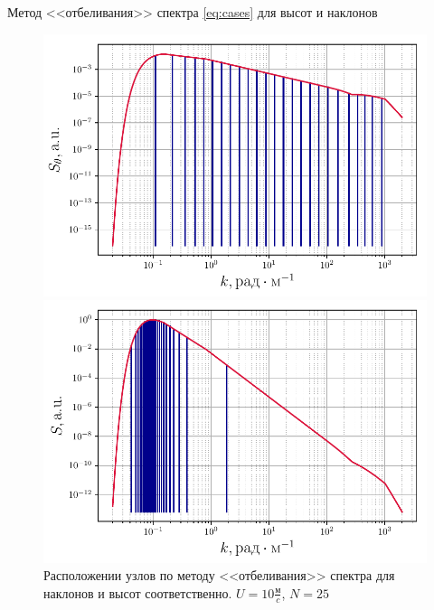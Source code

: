 \begin{frame}[t]{}
\begin{columns}[t]
\begin{column}{.48\linewidth}
\begin{block}{Метод <<отбеливания>> спектра}
                \eqref{eq:cases} для высот и наклонов
                \begin{figure}[H]
                    \begin{minipage}{0.49\linewidth}
                            \centering
                            \includegraphics[width=\linewidth]{fig/split_angles}	
                    \end{minipage}
                    \hfill
                    \begin{minipage}{0.49\linewidth}
                            \centering
                            \includegraphics[width=\linewidth]{fig/split_height}
                    \end{minipage}
                    \caption{Расположении узлов по методу <<отбеливания>> спектра  для наклонов и высот соответственно. $U=10 \frac{\text{м}}{c}$, $N=25$}
                    \label{fig:splits}		
                \end{figure}


\end{block}
\end{column}
\end{columns}
\end{frame}
